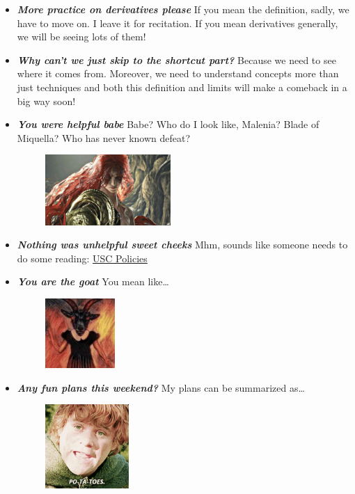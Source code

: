 \documentclass[11pt,letterpaper]{article}
\begin{document}
\begin{itemize}
\item {\bfseries\itshape More practice on derivatives please} If you mean the definition, sadly, we have to move on. I leave it for recitation. If you mean derivatives generally, we will be seeing lots of them!

\item {\bfseries\itshape Why can't we just skip to the shortcut part?} Because we need to see where it comes from. Moreover, we need to understand concepts more than just techniques and both this definition and limits will make a comeback in a big way soon!

\item {\bfseries\itshape You were helpful babe} Babe? Who do I look like, Malenia? Blade of Miquella? Who has never known defeat? 
	\begin{figure}[H]
	\centering
	\includegraphics[width=0.45\textwidth]{images/malenia.jpg}
	\end{figure}

\item {\bfseries\itshape Nothing was unhelpful sweet cheeks} Mhm, sounds like someone needs to do some reading: \href{https://www.sc.edu/about/offices\_and\_divisions/civil\_rights\_title\_ix/documents/prior\_sexual\_harassment\_eop\_102.pdf}{USC Policies}

\item {\bfseries\itshape You are the goat} You mean like\dots
	\begin{figure}[H]
	\centering
	\includegraphics[width=0.25\textwidth]{images/goat2.png}
	\end{figure}

\item {\bfseries\itshape Any fun plans this weekend?} My plans can be summarized as\dots
	\begin{figure}[H]
	\centering
	\includegraphics[width=0.30\textwidth]{images/potatoes.png}
	\end{figure}


\end{itemize}
\end{document}
